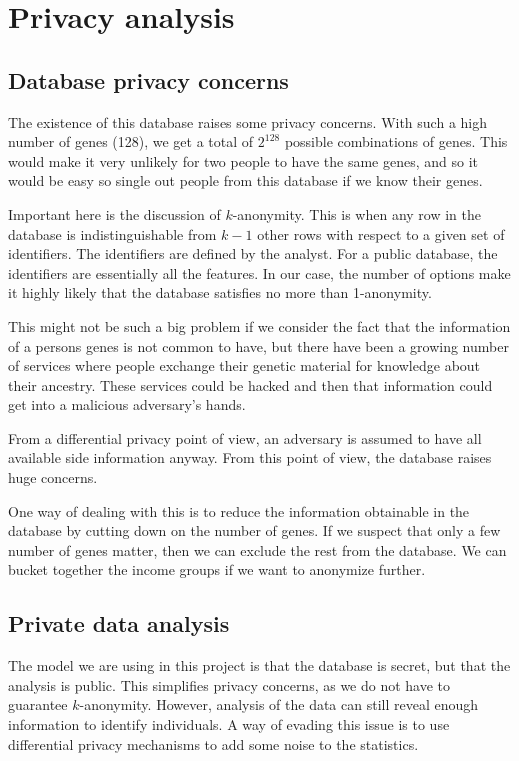 \section*{Privacy analysis}

\subsection*{Database privacy concerns}
The existence of this database raises some privacy concerns. With such a high number of genes (128), we get a total of $2^{128}$ possible combinations of genes. This would make it very unlikely for two people to have the same genes, and so it would be easy so single out people from this database if we know their genes. 
    
Important here is the discussion of $k$-anonymity. This is when any row in the database is indistinguishable from $k-1$ other rows with respect to a given set of identifiers. The identifiers are defined by the analyst. For a public database, the identifiers are essentially all the features. In our case, the number of options make it highly likely that the database satisfies no more than 1-anonymity. 
    
This might not be such a big problem if we consider the fact that the information of a persons genes is not common to have, but there have been a growing number of services where people exchange their genetic material for knowledge about their ancestry. These services could be hacked and then that information could get into a malicious adversary's hands. 
    
From a differential privacy point of view, an adversary is assumed to have all available side information anyway. From this point of view, the database raises huge concerns. 
    
One way of dealing with this is to reduce the information obtainable in the database by cutting down on the number of genes. If we suspect that only a few number of genes matter, then we can exclude the rest from the database. We can bucket together the income groups if we want to anonymize further. 

\subsection*{Private data analysis}
The model we are using in this project is that the database is secret, but that the analysis is public. This simplifies privacy concerns, as we do not have to guarantee $k$-anonymity. However, analysis of the data can still reveal enough information to identify individuals. A way of evading this issue is to use differential privacy mechanisms to add some noise to the statistics. 

